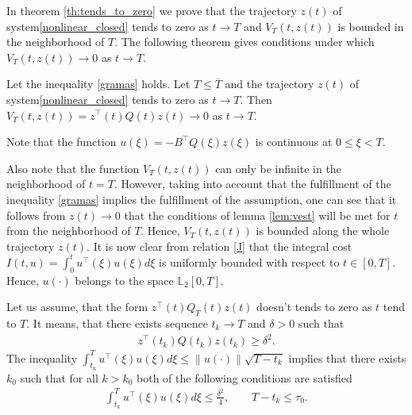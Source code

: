 \documentclass[../main.tex]{subfiles}
\begin{document}
In theorem \ref{th:tends_to_zero} we prove  that the trajectory $z(t)$  of system\eqref{nonlinear_closed} tends to zero as $t\to T$ and $V_{T}(t,z(t))$ is bounded in the neighborhood of $T$. The following theorem gives conditions under which  $V_{T}(t,z(t))\to 0$ as $t\to T$.
\begin{theorem}
    Let the inequality \eqref{gramas} holds. Let $T \leqslant \overline{T}$ and the trajectory $z(t)$  of system\eqref{nonlinear_closed} tends to zero as $t\to T$. Then  $V_{T}(t,z(t))  =z^{\top}(t)Q(t)z(t) \to 0$  as $t \to T$.
\end{theorem}
\doc
    Note that the function $ u(\xi) = -B^{\top} Q(\xi) z(\xi)$ is continuous at $0 \leqslant \xi <T$. 

    Also note that the function $V_{T}(t,z(t))$ can only be infinite in the neighborhood of $t = T$. However, taking into account that the fulfillment of the inequality \eqref{gramas} implies the fulfillment of the assumption, one can see that it follows from  $z(t) \to 0 $ that the conditions of lemma \ref{lem:vest} will be met for $t$ from the neighborhood of $T$.
    Hence, $V_{T}(t,z(t))$ is bounded along the whole trajectory $z(t)$. It is now clear from relation \eqref{J} that the integral cost $I(t,u) = \int_{0}^{t} u^{\top}(\xi)u(\xi) d\xi$  is uniformly bounded with respect to $t\in [0,T]$. Hence, $u(\cdot)$ belongs to the space $\mathbb L_2[0,T]$. 
    
   Let us assume, that the form $z^{\top}(t)Q_T(t)z(t) $ doesn't tends to zero as $t$ tend to $T$.
    It means, that there exists sequence $ t_k \to T$ and $\delta > 0$ such that 
    \begin{gather}\label{zqz_geq_del2}
    z^{\top}(t_k)Q(t_k)z(t_k) \geqslant \delta^2.  
    \end{gather}
    The inequality $ \int_{t_k}^{T} u^{\top}(\xi)u(\xi) d\xi \leqslant 
\|u(\cdot)\|\sqrt{T - t_k}  $ implies that there exists $k_0$ such that for all $k > k_0$ both of the following conditions are satisfied 
\begin{gather*}
    \int_{t_k}^{T} u^{\top}(\xi)u(\xi) d\xi \leqslant \frac{\delta^2}{4}, \qquad T-t_k \leqslant \tau_0.
\end{gather*}
\end{document}
